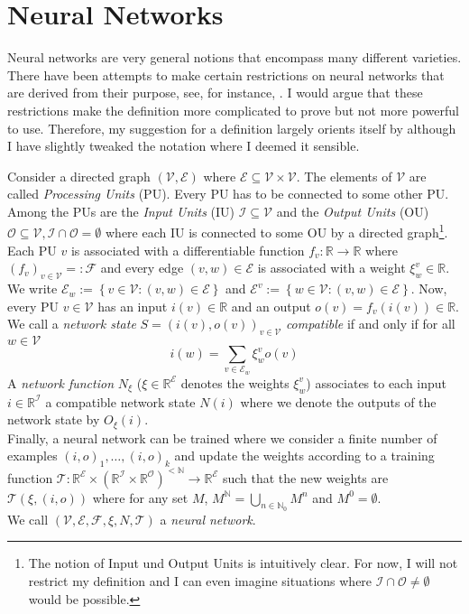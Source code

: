 \documentclass[a4paper,11pt]{article}
\begin{document}
\section{Neural Networks}
Neural networks are very general notions that encompass many different varieties. There have been attempts to make certain restrictions on neural networks that are derived from their purpose, see, for instance, \cite{Guresen2011}. I would argue that these restrictions make the definition more complicated to prove but not more powerful to use. Therefore, my suggestion for a definition largely orients itself by \cite{Rojas1996} although I have slightly tweaked the notation where I deemed it sensible.
\begin{Def}
Consider a directed graph $(\mathcal{V}, \mathcal{E})$ where $\mathcal{E}\subseteq \mathcal{V}\times\mathcal{V}$. The elements of $\mathcal{V}$ are called \emph{Processing Units} (PU). Every PU has to be connected to some other PU. Among the PUs are the \emph{Input Units} (IU) $\mathcal{I}\subseteq\mathcal{V}$ and the \emph{Output Units} (OU) $\mathcal{O}\subseteq\mathcal{V}, \mathcal{I}\cap\mathcal{O}=\emptyset$ where each IU is connected to some OU by a directed graph\footnote{
The notion of Input und Output Units is intuitively clear. For now, I will not restrict my definition and I can even imagine situations where $\mathcal{I}\cap\mathcal{O}\ne\emptyset$ would be possible.}.
Each PU $v$ is associated with a differentiable function $f_v:\mathbb{R}\to\mathbb{R}$ where $(f_v)_{v\in\mathcal{V}}=:\mathcal{F}$ and every edge $(v,w)\in\mathcal{E}$ is associated with a weight $\xi^v_w\in\mathbb{R}$. We write $\mathcal{E}_w:=\left\{v\in\mathcal{V}:(v,w)\in\mathcal{E}\right\}$ and $\mathcal{E}^v:=\left\{w\in\mathcal{V}:(v,w)\in\mathcal{E}\right\}$. Now, every PU $v\in\mathcal{V}$ has an input $i(v)\in\mathbb{R}$ and an output $o(v)=f_v\left(i(v)\right)\in\mathbb{R}$. We call a \emph{network state} $S=\left(i(v),o(v)\right)_{v\in\mathcal{V}}$ \emph{compatible} if and only if for all $w\in\mathcal{V}$
\begin{equation}\label{aggr}
i(w)=\sum_{v\in\mathcal{E}_w}\xi^v_wo(v)
\end{equation}
A \emph{network function} $N_{\xi}$ ($\xi\in\mathbb{R}^{\mathcal{E}}$ denotes the weights $\xi^v_w$) associates to each input $i\in\mathbb{R}^{\mathcal{I}}$ a compatible network state $N(i)$ where we denote the outputs of the network state by $O_{\xi}(i)$.\\
Finally, a neural network can be trained where we consider a finite number of examples $(i,o)_1,\dotsc,(i,o)_k$ and update the weights according to a training function $\mathcal{T}:\mathbb{R}^{\mathcal{E}}\times\left(\mathbb{R}^{\mathcal{I}}\times\mathbb{R}^{\mathcal{O}}\right)^{<\mathbb{N}}\to\mathbb{R}^{\mathcal{E}}$ such that the new weights are $\mathcal{T}(\xi,(i,o))$ where for any set $M$, $M^{\mathbb{N}}=\bigcup_{n\in\mathbb{N}_0}M^n$ and $M^0={\emptyset}$.\\
We call $(\mathcal{V},\mathcal{E},\mathcal{F},\xi,N,\mathcal{T})$ a \emph{neural network}.
\end{Def}
\end{document}
